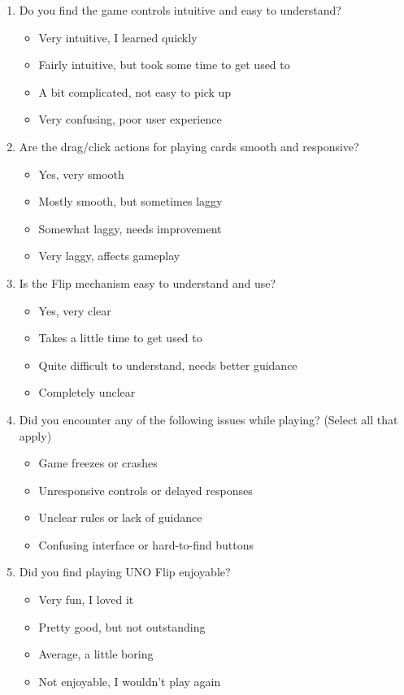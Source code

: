 \documentclass[12pt]{article}
\begin{document}
\begin{enumerate}
    \item Do you find the game controls intuitive and easy to understand?
    \begin{itemize}
        \item Very intuitive, I learned quickly
        \item Fairly intuitive, but took some time to get used to
        \item A bit complicated, not easy to pick up
        \item Very confusing, poor user experience
    \end{itemize}

    \item Are the drag/click actions for playing cards smooth and responsive?
    \begin{itemize}
        \item Yes, very smooth
        \item Mostly smooth, but sometimes laggy
        \item Somewhat laggy, needs improvement
        \item Very laggy, affects gameplay
    \end{itemize}

    \item Is the Flip mechanism easy to understand and use?
    \begin{itemize}
        \item Yes, very clear
        \item Takes a little time to get used to
        \item Quite difficult to understand, needs better guidance
        \item Completely unclear
    \end{itemize}

    \item Did you encounter any of the following issues while playing? (Select all that apply)
    \begin{itemize}
        \item Game freezes or crashes
        \item Unresponsive controls or delayed responses
        \item Unclear rules or lack of guidance
        \item Confusing interface or hard-to-find buttons
    \end{itemize}

    \item Did you find playing UNO Flip enjoyable?
    \begin{itemize}
        \item Very fun, I loved it
        \item Pretty good, but not outstanding
        \item Average, a little boring
        \item Not enjoyable, I wouldn’t play again
    \end{itemize}


\end{enumerate}
\end{document}
